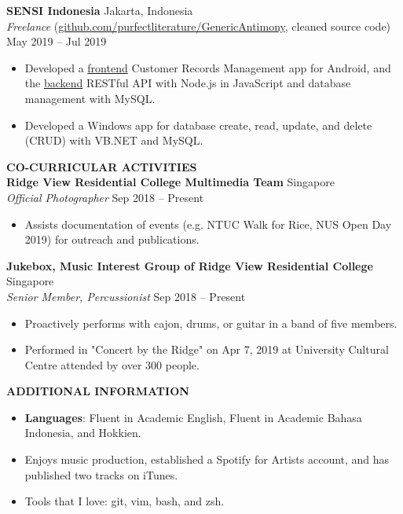 \documentclass[a4paper, 11pt]{article}
\newcommand{\interspace}{\vspace{7pt}}
\newcommand{\intraspace}{\vspace{2pt}}
\begin{document}
	\intraspace
	
	\textbf{SENSI Indonesia} \hfill Jakarta, Indonesia\\
	\textit{Freelance} (\href{https://github.com/purfectliterature/GenericAntimony}{github.com/purfectliterature/GenericAntimony}, cleaned source code) \hfill May 2019 -- Jul 2019
	\begin{itemize}[leftmargin=*, noitemsep, topsep=0pt]
		\item Developed a \href{https://github.com/purfectliterature/GenericAntimony}{frontend} Customer Records Management app for Android, and the \href{https://github.com/purfectliterature/GenericAntimonyBackend}{backend} RESTful API with Node.js in JavaScript and database management with MySQL.
		\item Developed a Windows app for database create, read, update, and delete (CRUD) with VB.NET and MySQL.
	\end{itemize}
	
	\interspace
	
	\textbf{\large CO-CURRICULAR ACTIVITIES} \hrulefill \\
	\textbf{Ridge View Residential College Multimedia Team} \hfill Singapore\\
	\textit{Official Photographer} \hfill Sep 2018 -- Present
	\begin{itemize}[leftmargin=*, noitemsep, topsep=0pt]
		\item Assists documentation of events (e.g. NTUC Walk for Rice, NUS Open Day 2019) for outreach and publications.
	\end{itemize}
	\intraspace
	
	\textbf{Jukebox, Music Interest Group of Ridge View Residential College} \hfill Singapore\\
	\textit{Senior Member, Percussionist} \hfill Sep 2018 -- Present
	\begin{itemize}[leftmargin=*, noitemsep, topsep=0pt]
		\item Proactively performs with cajon, drums, or guitar in a band of five members.
		\item Performed in "Concert by the Ridge" on Apr 7, 2019 at University Cultural Centre attended by over 300 people.
	\end{itemize}

	\interspace
	
	\textbf{\large ADDITIONAL INFORMATION} \hrulefill
	\begin{itemize}[leftmargin=*, noitemsep, topsep=0pt]
		\item \textbf{Languages}: Fluent in Academic English, Fluent in Academic Bahasa Indonesia, and Hokkien.
		\item Enjoys music production, established a Spotify for Artists account, and has published two tracks on iTunes.
		\item Tools that I love: git, vim, bash, and zsh.
	\end{itemize}
\end{document}
